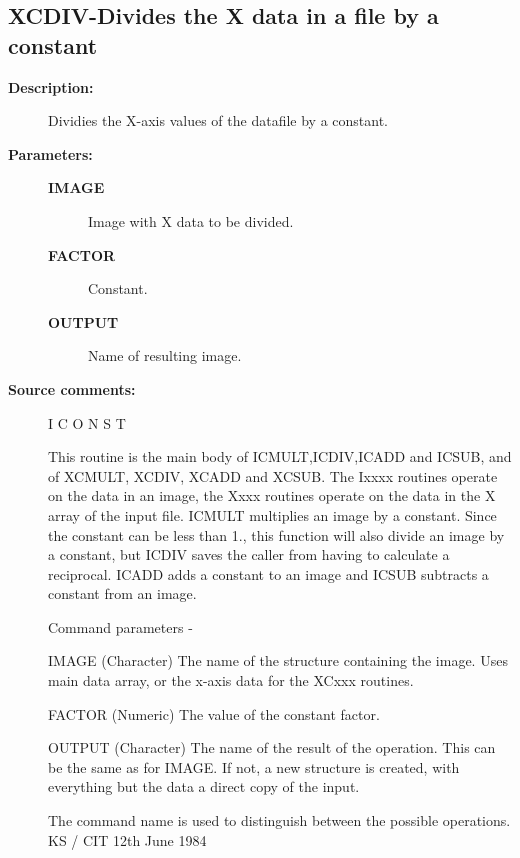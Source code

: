 \subsection{XCDIV-\label{XCDIV}Divides the X data in a file by a constant}
\begin{description}

\item [\textbf{Description:}]
 Dividies the X-axis values of the datafile by a constant.

\item [\textbf{Parameters:}]
\begin{description}
\item [\textbf{IMAGE}]
 Image with X data to be divided.
\item [\textbf{FACTOR}]
 Constant.
\item [\textbf{OUTPUT}]
 Name of resulting image.
\end{description}

\item [\textbf{Source comments:}]
\begin{terminalv}
 I C O N S T

 This routine is the main body of ICMULT,ICDIV,ICADD and ICSUB,
 and of XCMULT, XCDIV, XCADD and XCSUB.  The Ixxxx routines
 operate on the data in an image, the Xxxx routines operate on
 the data in the X array of the input file.
 ICMULT multiplies an image by a constant.  Since the constant
 can be less than 1., this function will also divide an
 image by a constant, but ICDIV saves the caller from having
 to calculate a reciprocal. ICADD adds a constant to an image and
 ICSUB subtracts a constant from an image.

 Command parameters -

 IMAGE  (Character) The name of the structure containing the image.
        Uses main data array, or the x-axis data for the XCxxx routines.

 FACTOR (Numeric) The value of the constant factor.

 OUTPUT (Character) The name of the result of the operation.  This
        can be the same as for IMAGE.  If not, a new structure
        is created, with everything but the data a direct
        copy of the input.

 The command name is used to distinguish between the
 possible operations.
                                  KS / CIT 12th June 1984
\end{terminalv}
\end{description}
